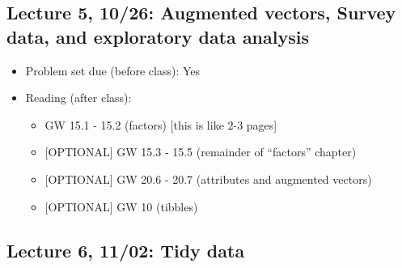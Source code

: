 \documentclass[11pt,]{article}
\providecommand{\tightlist}{%
  \setlength{\itemsep}{0pt}\setlength{\parskip}{0pt}}
\begin{document}
\subsection{Lecture 5, 10/26: Augmented vectors, Survey data, and
exploratory data
analysis}\label{lecture-5-1026-augmented-vectors-survey-data-and-exploratory-data-analysis}

\begin{itemize}
\tightlist
\item
  Problem set due (before class): Yes
\item
  Reading (after class):

  \begin{itemize}
  \tightlist
  \item
    GW 15.1 - 15.2 (factors) {[}this is like 2-3 pages{]}
  \item
    {[}OPTIONAL{]} GW 15.3 - 15.5 (remainder of ``factors'' chapter)
  \item
    {[}OPTIONAL{]} GW 20.6 - 20.7 (attributes and augmented vectors)
  \item
    {[}OPTIONAL{]} GW 10 (tibbles)
  \end{itemize}
\end{itemize}

\subsection{Lecture 6, 11/02: Tidy data}\label{lecture-6-1102-tidy-data}
\end{document}
